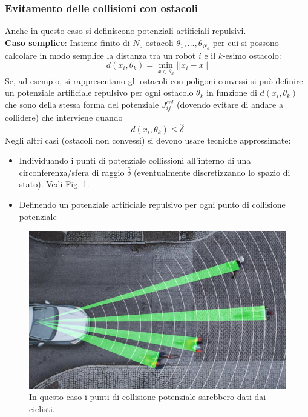 \subsubsection{Evitamento delle collisioni con ostacoli}

Anche in questo caso si definiscono potenziali artificiali repulsivi.\\
\textbf{Caso semplice}: Insieme finito di $N_o$ ostacoli $\theta_1, \dots, \theta_{N_o}$ per cui si possono calcolare in modo semplice la distanza tra un robot $i$ e il $k$-esimo ostacolo:
\begin{equation}
d(x_i, \theta_k) = \min_{x \in \theta_k} ||x_i - x||
\end{equation} Se, ad esempio, si rappresentano gli ostacoli con poligoni convessi si pu\`o definire un potenziale artificiale repulsivo per ogni ostacolo $\theta_k$ in funzione di $d(x_i, \theta_k)$ che sono della stessa forma del potenziale $J_{ij}^{col}$ (dovendo evitare di andare a collidere) che interviene quando 
\begin{equation}
d(x_i, \theta_k) \leq \hat{\delta}
\end{equation} Negli altri casi (ostacoli non convessi) si devono usare tecniche approssimate:
\begin{itemize}
\item Individuando i punti di potenziale collissioni all'interno di una circonferenza/sfera di raggio $\hat{\delta}$ (eventualmente discretizzando lo spazio di stato). Vedi Fig. \ref{fig:pedest}.
\item Definendo un potenziale artificiale repulsivo per ogni punto di collisione potenziale
\end{itemize}
\begin{figure}[htbp]
    \centering
    \includegraphics[scale=0.5]{img/Volvo_Pedestrian_System.jpg}
    \caption{In questo caso i punti di collisione potenziale sarebbero dati dai ciclisti.}
    \label{fig:pedest}
\end{figure}

